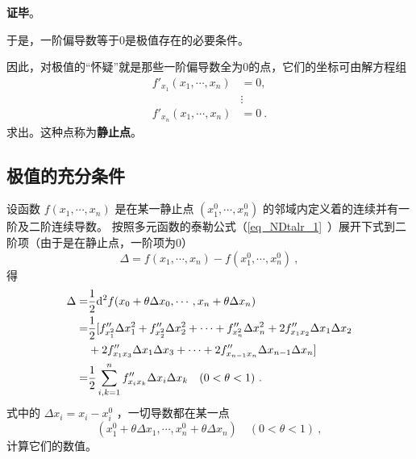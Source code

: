 \textbf{证毕}。

于是，一阶偏导数等于0是极值存在的必要条件。

因此，对极值的“怀疑”就是那些一阶偏导数全为0的点，它们的坐标可由解方程组
\begin{equation}
\begin{aligned}
f'_{x_1}(x_1,\cdots,x_n)&=0,\\
&\vdots\\
f'_{x_n}(x_1,\cdots,x_n)&=0~.
\end{aligned}
\end{equation}
求出。这种点称为\textbf{静止点}。

\subsection{极值的充分条件}
设函数 $f(x_1,\cdots,x_n)$ 是在某一静止点 $(x_1^0,\cdots,x_n^0)$ 的邻域内定义着的连续并有一阶及二阶连续导数。
按照多元函数的泰勒公式（\autoref{eq_NDtalr_1}~）展开下式到二阶项（由于是在静止点，一阶项为0）
\begin{equation}
\Delta=f(x_1,\cdots,x_n)-f(x_1^0,\cdots,x_n^0)~,
\end{equation}
得
\begin{equation}
\begin{aligned}
\Delta=&\frac{1}{2}\mathrm{d}^2 f(x_0+\theta\Delta x_0,\cdots,x_n+\theta\Delta x_n)\\
=&\frac{1}{2}[f''_{x_1^2}\Delta x_1^2+f''_{x_2^2}\Delta x_2^2+\cdots+f''_{x_n^2}\Delta x_n^2+2f''_{x_1x_2}\Delta x_1\Delta x_2\\
&+2f''_{x_1x_3}\Delta x_1\Delta x_3+\cdots+2f''_{x_{n-1}x_n}\Delta x_{n-1}\Delta x_n\large]
 \\
 =&\frac{1}{2}\sum_{i,k=1}^nf''_{x_ix_k}\Delta x_i\Delta x_k \quad (0<\theta<1)~.
\end{aligned}
\end{equation}
式中的 $\Delta x_i=x_i-x_i^0$ ，一切导数都在某一点
\begin{equation}
(x_1^0+\theta\Delta x_1,\cdots,x_n^0+\theta\Delta x_n) \quad (0<\theta<1)~,
\end{equation}
计算它们的数值。

